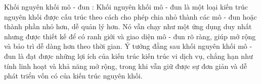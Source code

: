 Khối nguyên khối mô - đun : Khối nguyên khối mô - đun là một loại kiến trúc nguyên khối được cấu trúc theo cách cho phép chia nhỏ thành các mô - đun hoặc thành phần nhỏ hơn, dễ quản lý hơn. Nó vẫn chạy như một ứng dụng duy nhất nhưng được thiết kế để có ranh giới và giao diện mô - đun rõ ràng, giúp mở rộng và bảo trì dễ dàng hơn theo thời gian. Ý tưởng đằng sau khối nguyên khối mô - đun là đạt được những lợi ích của kiến trúc kiến trúc vi dịch vụ, chẳng hạn như tính linh hoạt và khả năng mở rộng, trong khi vẫn giữ được sự đơn giản và dễ phát triển vốn có của kiến trúc nguyên khối.

